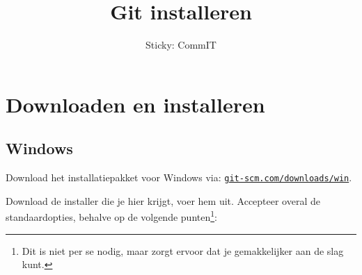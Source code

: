 \documentclass[a4paper]{extarticle}
\title{Git installeren}
\author{Sticky: CommIT}
\date{}
\newcommand{\lett}[1]{\texttt{#1}}
\begin{document}
\maketitle
\thispagestyle{empty} %

\tableofcontents

\section{Downloaden en installeren}

\subsection{Windows}
Download het installatiepakket voor Windows via: \href{https://git-scm.com/downloads}{\lett{git-scm.com/downloads/win}}.

Download de installer die je hier krijgt, voer hem uit. Accepteer overal de standaardopties, behalve op de volgende
punten\footnote{Dit is niet per se nodig, maar zorgt ervoor dat je gemakkelijker aan de slag kunt.}:
\end{document}
